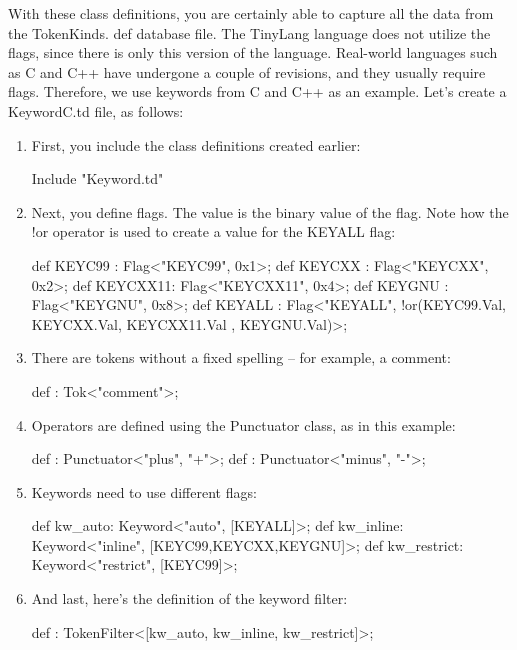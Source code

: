 With these class definitions, you are certainly able to capture all the data from the TokenKinds. def database file. The TinyLang language does not utilize the flags, since there is only this version of the language. Real-world languages such as C and C++ have undergone a couple of revisions, and they usually require flags. Therefore, we use keywords from C and C++ as an example. Let’s create a KeywordC.td file, as follows:

\begin{enumerate}
\item
First, you include the class definitions created earlier:

\begin{shell}
Include "Keyword.td"
\end{shell}

\item
Next, you define flags. The value is the binary value of the flag. Note how the !or operator is used to create a value for the KEYALL flag:

\begin{shell}
def KEYC99 : Flag<"KEYC99", 0x1>;
def KEYCXX : Flag<"KEYCXX", 0x2>;
def KEYCXX11: Flag<"KEYCXX11", 0x4>;
def KEYGNU : Flag<"KEYGNU", 0x8>;
def KEYALL : Flag<"KEYALL",
                    !or(KEYC99.Val, KEYCXX.Val,
                        KEYCXX11.Val , KEYGNU.Val)>;
\end{shell}

\item
There are tokens without a fixed spelling – for example, a comment:

\begin{shell}
def : Tok<"comment">;
\end{shell}

\item
Operators are defined using the Punctuator class, as in this example:

\begin{shell}
def : Punctuator<"plus", "+">;
def : Punctuator<"minus", "-">;
\end{shell}

\item
Keywords need to use different flags:

\begin{shell}
def kw_auto: Keyword<"auto", [KEYALL]>;
def kw_inline: Keyword<"inline", [KEYC99,KEYCXX,KEYGNU]>;
def kw_restrict: Keyword<"restrict", [KEYC99]>;
\end{shell}

\item
And last, here’s the definition of the keyword filter:

\begin{shell}
def : TokenFilter<[kw_auto, kw_inline, kw_restrict]>;
\end{shell}
\end{enumerate}

